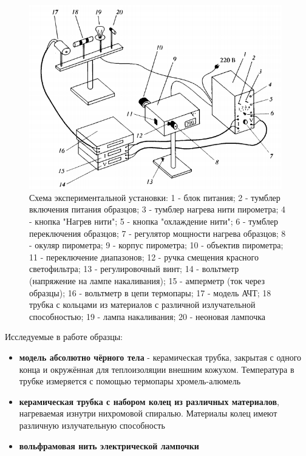 \documentclass[a4paper, 12pt]{article}%
\begin{document}
\begin{figure}[h]
    \centering
    \includegraphics[width=11cm]{fig1.PNG}
    \caption{Схема экспериментальной установки: 1 - блок питания; 2 - тумблер включения питания образцов; 3 - тумблер нагрева нити пирометра; 4 - кнопка "Нагрев нити"; 5 - кнопка "охлаждение нити"; 6 - тумблер переключения образцов; 7 - регулятор мощности нагрева образцов; 8 - окуляр пирометра; 9 - корпус пирометра; 10 - объектив пирометра; 11 - переключение диапазонов; 12 - ручка смещения красного светофильтра; 13 - регулировочный винт; 14 - вольтметр (напряжение на лампе накаливания); 15 - амперметр (ток через образцы); 16 - вольтметр в цепи термопары; 17 - модель АЧТ; 18 трубка с кольцами из материалов с различной излучательной способностью; 19 - лампа накаливания; 20 - неоновая лампочка}
    \label{fig:vac}
\end{figure}

Исследуемые в работе образцы:
\begin{itemize}
    \item \textbf{модель абсолютно чёрного тела} - керамическая трубка, закрытая с одного конца и окружённая для теплоизоляции внешним кожухом. Температура в трубке измеряется с помощью термопары хромель-алюмель
    \item \textbf{керамическая трубка с набором колец из различных материалов}, нагреваемая изнутри нихромовой спиралью. Материалы колец имеют различную излучательную способность
    \item \textbf{вольфрамовая нить электрической лампочки}
\end{itemize}
\end{document}
